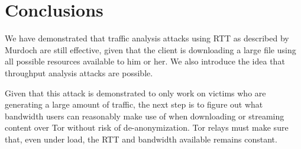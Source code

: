 \documentclass[12pt,journal]{IEEEtran}
\begin{document}
\section{Conclusions}
We have demonstrated that traffic analysis attacks using RTT as described by Murdoch are still effective, given that the client is downloading a large file using all possible resources available to him or her. We also introduce the idea that throughput analysis attacks are possible.
\par
Given that this attack is demonstrated to only work on victims who are generating a large amount of traffic, the next step is to figure out what bandwidth users can reasonably make use of when downloading or streaming content over Tor without risk of de-anonymization. Tor relays must make sure that, even under load, the RTT and bandwidth available remains constant.
\printbibliography
\end{document}
